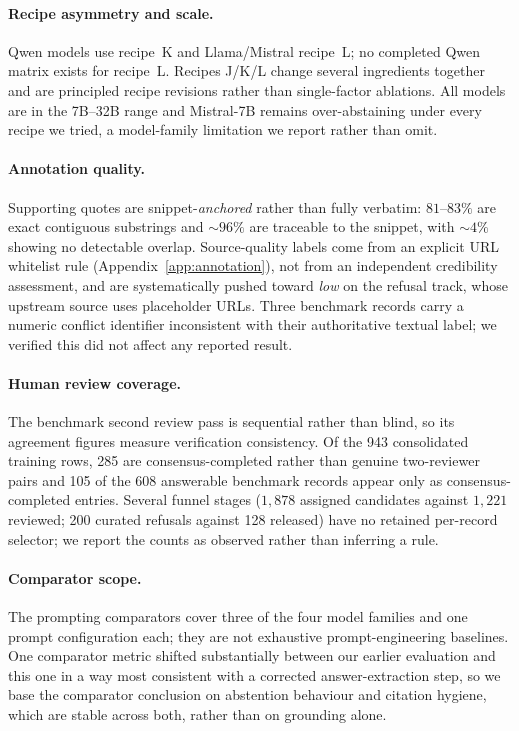 \paragraph{Recipe asymmetry and scale.} Qwen models use recipe~K and
Llama/Mistral recipe~L; no completed Qwen matrix exists for recipe~L. Recipes
J/K/L change several ingredients together and are principled recipe revisions
rather than single-factor ablations. All models are in the 7B--32B range and
Mistral-7B remains over-abstaining under every recipe we tried, a model-family
limitation we report rather than omit.

\paragraph{Annotation quality.} Supporting quotes are snippet-\emph{anchored}
rather than fully verbatim: $81$--$83\%$ are exact contiguous substrings and
${\sim}96\%$ are traceable to the snippet, with ${\sim}4\%$ showing no detectable
overlap. Source-quality labels come from an explicit URL whitelist rule
(Appendix~\ref{app:annotation}), not from an independent credibility assessment,
and are systematically pushed toward \textit{low} on the refusal track, whose
upstream source uses placeholder URLs. Three benchmark
records carry a numeric conflict identifier inconsistent with their
authoritative textual label; we verified this did not affect any reported result.

\paragraph{Human review coverage.} The benchmark second review pass is
sequential rather than blind, so its agreement figures measure verification
consistency. Of the 943 consolidated training rows, 285 are consensus-completed
rather than genuine two-reviewer pairs and 105 of the 608 answerable benchmark
records appear only as consensus-completed entries. Several funnel stages
($1{,}878$ assigned candidates against $1{,}221$ reviewed; 200 curated refusals
against 128 released) have no retained per-record selector; we report the
counts as observed rather than inferring a rule.

\paragraph{Comparator scope.} The prompting comparators cover three of the four
model families and one prompt configuration each; they are not exhaustive
prompt-engineering baselines. One comparator metric shifted substantially
between our earlier evaluation and this one in a way most consistent with a
corrected answer-extraction step, so we base the comparator conclusion on
abstention behaviour and citation hygiene, which are stable across both, rather
than on grounding alone.

